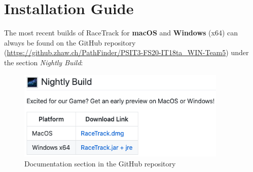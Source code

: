 \section{Installation Guide}
	The most recent builds of RaceTrack for \textbf{macOS} and \textbf{Windows} (x64) can always be found on the GitHub repository (\url{https://github.zhaw.ch/PathFinder/PSIT3-FS20-IT18ta_WIN-Team5}) under the section \textit{Nightly Build}:
	\begin{figure}[H]
		\centering
		\includegraphics[width=10cm,keepaspectratio,center]{img/Implementation_Installation-Guide_Nightly-Build-Section.png}
		\caption{Documentation section in the GitHub repository}
	\end{figure}
	
